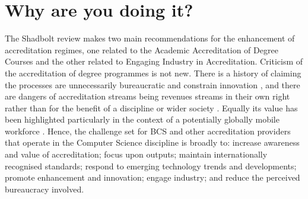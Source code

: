 \documentclass[sigconf]{acmart}
\begin{document}
\section {Why are you doing it?}	
The Shadbolt review \cite[p.~8]{shadbolt2016shadbolt} makes two main
recommendations for the enhancement of accreditation regimes, one
related to the Academic Accreditation of Degree Courses and the other
related to Engaging Industry in Accreditation. Criticism of the
accreditation of degree programmes is not new. There is a history of
claiming the processes are unnecessarily bureaucratic and constrain
innovation \cite{Harvey2004}, and there are dangers of accreditation
streams being revenues streams in their own right rather than for the
benefit of a discipline or wider society \cite{Knight_2015}. Equally
its value has been highlighted particularly in the context of a
potentially globally mobile workforce \cite{Knight_2015}. Hence, the
challenge set for BCS and other accreditation providers that operate
in the Computer Science discipline is broadly to: increase awareness
and value of accreditation; focus upon outputs; maintain
internationally recognised standards; respond to emerging technology
trends and developments; promote enhancement and innovation; engage
industry; and reduce the perceived bureaucracy involved.

\begin{comment}

	"Recommendation 9 - Academic Accreditation of Degree Courses.
	
	BCS, IET and Tech Partnership should ensure that existing systems of degree course
	accreditation are flexible, agile, and enable HE providers to respond to changing
	demand and emerging technological trends and developments. Accreditation of courses
	should be focused on outputs. Accrediting bodies should work to increase awareness
	and value of accreditation so that it is valued by HE providers, students and employers,
	and consider how their role can provide a forum for engagement between HE and
	employers.

	Recommendation 10 - Engaging industry in accreditation.

	Employers, through employer groups, such as Tech Partnership, should engage more
	consistently with HE providers and BCS \& IET to ensure accreditation is effective and
	reflects current industry demand."
\end{comment} 
\end{document}
